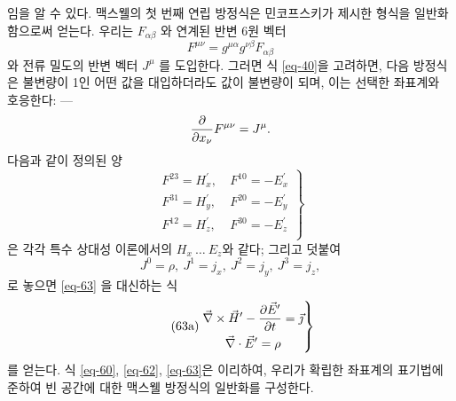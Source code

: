 임을 알 수 있다.
맥스웰의 첫 번째 연립 방정식은 민코프스키가 제시한 형식을 일반화함으로써 얻는다. 우리는  $F_{\alpha\beta}$ 와 연계된 반변 6원 벡터
\begin{equation} \label{eq-62}
	F^{\mu\nu} = g^{\mu\alpha} g^{\nu\beta} F_{\alpha\beta}
\end{equation}
와 전류 밀도의 반변 벡터 $J^\mu$
를 도입한다. 그러면 식 \eqref{eq-40}을 고려하면, 다음 방정식은  불변량이 1인 어떤 값을 대입하더라도 값이 불변량이 되며, 이는 선택한 좌표계와 호응한다: ---
\begin{equation} \label{eq-63}
	{\frac{{\partial}{}}{{\partial}{x_\nu}}} F^{\mu\nu} = J^\mu.
\end{equation}
다음과 같이 정의된 양
\begin{equation} \label{eq-64}
	\left.
	\begin{aligned}
		F^{2 3}=H_x^\prime, &~F^{1 0} = -E_x^\prime\\
		F^{3 1}=H_y^\prime, &~F^{2 0} = -E_y^\prime\\
		F^{1 2}=H_z^\prime, &~F^{3 0} = -E_z^\prime\\
	\end{aligned}
	\right\}
\end{equation}
은 각각 특수 상대성 이론에서의 $H_x~\dots~E_z$와 같다; 그리고 덧붙여
\begin{equation*}
	J^0 = \rho,~J^1 = j_x,~J^2 = j_y,~J^3 = j_z,
\end{equation*}로 놓으면 \eqref{eq-63} 을 대신하는 식
\begin{equation} \tag{63a} \label{eq-63a}
	\left.
	\begin{gathered}
		\vec{\nabla}\times \vec{H}^\prime-{\frac{{\partial}{\vec{E}^\prime}}{{\partial}{t}}}=\vec{\jmath} \\
		\vec{\nabla}\cdot \vec{E}^\prime = \rho
	\end{gathered}
	\right\}
\end{equation}
를 얻는다. 식  \eqref{eq-60}, \eqref{eq-62}, \eqref{eq-63}은 이리하여, 우리가 확립한 좌표계의 표기법에 준하여 빈 공간에 대한 맥스웰 방정식의 일반화를 구성한다.

